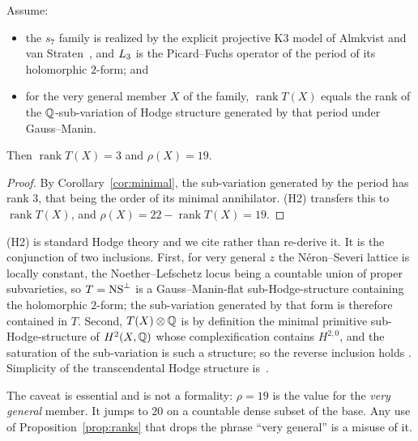 \begin{proposition}
\label{prop:ranks}
Assume:
\begin{itemize}
\item[\textbf{(H1)}] the $s_7$ family is realized by the explicit projective
  K3 model of Almkvist and van Straten~\cite{AlmkvistvanStraten2021}, and
  $L_3$ is the Picard--Fuchs operator of the period of its holomorphic
  $2$-form; and
\item[\textbf{(H2)}] for the very general member $X$ of the family,
  $\operatorname{rank}T(X)$ equals the rank of the $\mathbb{Q}$-sub-variation of Hodge
  structure generated by that period under Gauss--Manin.
\end{itemize}
Then $\operatorname{rank}T(X) = 3$ and $\rho(X) = 19$.
\end{proposition}

\begin{proof}
By Corollary~\ref{cor:minimal}, the sub-variation generated by the period has
rank $3$, that being the order of its minimal annihilator. (H2) transfers this
to $\operatorname{rank}T(X)$, and $\rho(X) = 22 - \operatorname{rank}T(X) = 19$.
\end{proof}

\begin{remark}[On (H2), and on the caveat that must travel with $\rho = 19$]
\label{rem:H2}
(H2) is standard Hodge theory and we cite rather than re-derive it. It is the
conjunction of two inclusions. First, for very general $z$ the N\'eron--Severi
lattice is locally constant, the Noether--Lefschetz locus being a countable
union of proper subvarieties, so $T = \operatorname{NS}^{\perp}$ is a Gauss--Manin-flat
sub-Hodge-structure containing the holomorphic $2$-form; the sub-variation
generated by that form is therefore contained in $T$. Second, $T(X)\otimes\mathbb{Q}$
is by definition the minimal primitive sub-Hodge-structure of $H^2(X,\mathbb{Q})$
whose complexification contains $H^{2,0}$, and the saturation of the
sub-variation is such a structure; so the reverse inclusion holds
\cite[ch.~3 \S3.1, ch.~17 \S17.1]{Huybrechts2016}. Simplicity of the
transcendental Hodge structure is~\cite[Thm.~1.6(a)]{Zarhin1983}.

The caveat is essential and is not a formality: $\rho = 19$ is the value for
the \emph{very general} member. It jumps to $20$ on a countable dense subset
of the base. Any use of Proposition~\ref{prop:ranks} that drops the phrase
``very general'' is a misuse of it.
\end{remark}

